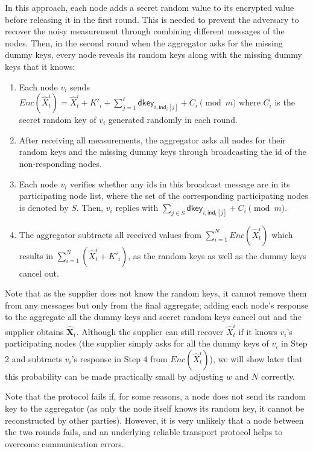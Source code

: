 \documentclass[11pt,a4paper]{article}
\theoremstyle{plain}
\theoremstyle{plain}
\theoremstyle{plain}
\theoremstyle{plain}
\theoremstyle{nonumberplain} \theoremseparator{}
\begin{document}
In this approach, each node adds a secret random value to its encrypted value before releasing it in the first round. This is needed to prevent the adversary to recover the noisy measurement through combining different messages of the nodes. Then, in the second round when the aggregator asks for the missing dummy keys, every node reveals its random keys along with the missing dummy keys that it knows:
\begin{enumerate}
\item Each node $v_{i}$ sends 
$
\mathit{Enc}(\hat{X}_{t}^{i}) = \hat{X}_{t}^{i} + K'_{i} + \sum^\ell_{j=1} \mathsf{dkey}_{i,\mathsf{ind}_i[j]} + C_{i} \pmod{m}
$
where $C_{i}$ is the secret random key of $v_{i}$ generated randomly in each round.

\item After receiving all measurements, the aggregator asks all nodes for their random keys and the missing dummy keys through broadcasting the id of the non-responding nodes. 

\item Each node $v_{i}$ verifies whether any ids in this broadcast message are in its participating node list, where the set of the corresponding participating nodes is denoted by $S$. Then, $v_i$ replies with $\sum_{j \in S} \mathsf{dkey}_{i,\mathsf{ind}_i[j]} + C_{i} \pmod{m}$. 

\item The aggregator subtracts all received values from $\sum_{i=1}^N \mathit{Enc}(\hat{X}_{t}^i)$ which results in $\sum^N_{i=1} (\hat{X}_{t}^{i} + K'_i)$, as the random keys as well as the dummy keys cancel out. 
\end{enumerate} 

Note that as the supplier does not know the random keys, it cannot remove them from any messages but only from the final aggregate; adding each node's response to the aggregate all the dummy keys and secret random keys cancel out and the supplier obtains $\hat{\mathbf{X}}_{t}$. 
Although
the supplier can still recover $\hat{X}_t^i$ if it knows $v_i$'s participating nodes (the supplier simply asks for all the dummy keys of $v_i$ in Step 2 and subtracts $v_i$'s response in Step 4 from $\mathit{Enc}(\hat{X}_t^i)$), we will show later that this probability can be made practically small by adjusting $w$ and $N$ correctly.   

Note that the protocol fails if, for some reasons, a node does not send its random key to the aggregator (as only the node itself knows its random key, it cannot be reconstructed by other parties). However, it is very unlikely that a node between the two rounds fails, and an underlying reliable transport protocol helps to overcome communication errors. 
\end{document}
